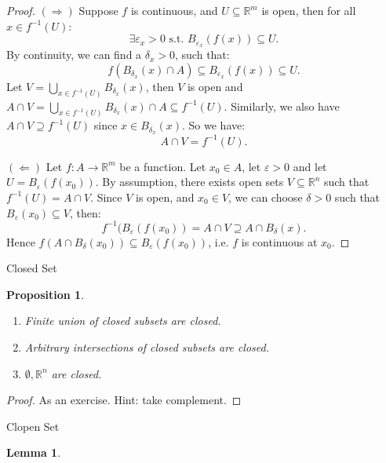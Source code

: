 \documentclass[11pt]{article}
\makeatletter
\newcounter{thmcounter}
\newenvironment{definition}[1]{\begin{defbox}{#1}{}}{\end{defbox}}
\theoremstyle{quiet}
\newtheorem{proposition}[thmcounter]{Proposition}
\newtheorem{lemma}[thmcounter]{Lemma}
\newtheorem{proposition}[tcb@cnt@defbox]{Proposition}
\newtheorem{lemma}[tcb@cnt@defbox]{Lemma}
\theoremstyle{quietremark}
\makeatother
\begin{document}
\begin{proof}
$(\Rightarrow)$ Suppose $f$ is continuous, and $U\subseteq\mathbb{R}^m$ is open, then for all $x\in f^{-1}(U)$:
\[
\exists\varepsilon_x>0\text{ s.t. }B_{\varepsilon_x}(f(x))\subseteq U.
\]
By continuity, we can find a $\delta_x>0$, such that: 
\[
f(B_{\delta_x}(x)\cap A)\subseteq B_{\varepsilon_x}(f(x))\subseteq U.
\]
Let $V=\displaystyle \bigcup_{x\in f^{-1}(U)}B_{\delta_x}(x)$, then $V$ is open and $\displaystyle A\cap V=\bigcup_{x\in f^{-1}(U)}B_{\delta_x}(x)\cap A\subseteq f^{-1}(U)$. Similarly, we also have $A\cap V\supseteq f^{-1}(U)$ since $x\in B_{\delta_x}(x)$. So we have: 
\[
A\cap V=f^{-1}(U).
\]

$(\Leftarrow)$ Let $f:A\to\mathbb{R}^m$ be a function. Let $x_0\in A$, let $\varepsilon>0$ and let $U=B_\varepsilon(f(x_0))$. By assumption, there exists open sets $V\subseteq\mathbb{R}^n$ such that $f^{-1}(U)=A\cap V$. Since $V$ is open, and $x_0\in V$, we can choose $\delta>0$ such that $B_\varepsilon(x_0)\subseteq V$, then: 
\[
f^{-1}(B_\varepsilon(f(x_0))=A\cap V\supseteq A \cap B_\delta(x).
\]
Hence $f(A\cap B_\delta(x_0))\subseteq B_\varepsilon(f(x_0))$, i.e. $f$ is continuous at $x_0$.
\end{proof}

\begin{definition}{Closed Set} 
\end{definition}

\begin{proposition}
\begin{enumerate}
\item Finite union of closed subsets are closed.
\item Arbitrary intersections of closed subsets are closed.
\item $\emptyset,\mathbb{R}^n$ are closed.
\end{enumerate}
\end{proposition}

\begin{proof}
As an exercise. Hint: take complement.
\end{proof}

\begin{definition}{Clopen Set}
\end{definition}

\begin{lemma}
\end{lemma}
\end{document}
